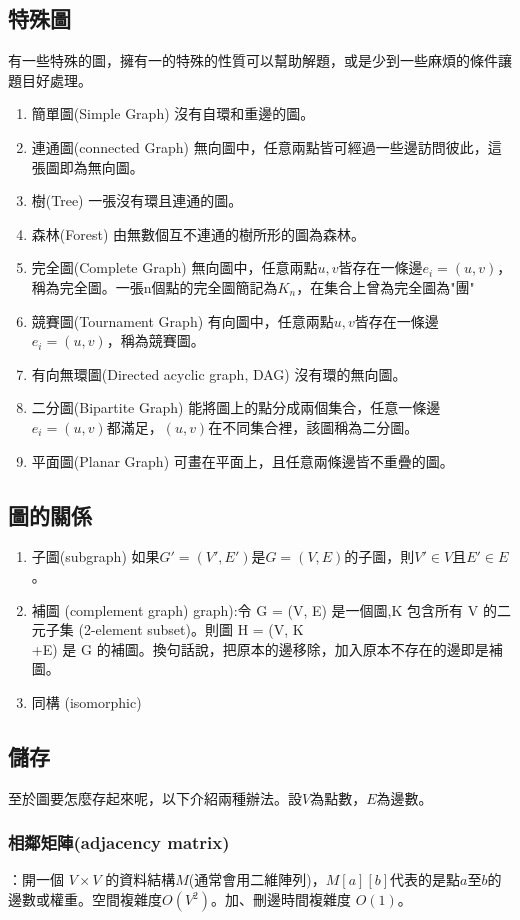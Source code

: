 \subsection{特殊圖}
有一些特殊的圖，擁有一的特殊的性質可以幫助解題，或是少到一些麻煩的條件讓題目好處理。
\begin{enumerate}
\item 簡單圖(Simple Graph) 沒有自環和重邊的圖。
\item 連通圖(connected Graph) 無向圖中，任意兩點皆可經過一些邊訪問彼此，這張圖即為無向圖。
\item 樹(Tree) 一張沒有環且連通的圖。
\item 森林(Forest) 由無數個互不連通的樹所形的圖為森林。
\item 完全圖(Complete Graph) 無向圖中，任意兩點$u, v$皆存在一條邊$e_i = (u, v)$，稱為完全圖。一張n個點的完全圖簡記為$K_n$，在集合上曾為完全圖為"團"
\item 競賽圖(Tournament Graph) 有向圖中，任意兩點$u, v$皆存在一條邊$e_i = (u, v)$，稱為競賽圖。
\item 有向無環圖(Directed acyclic graph, DAG) 沒有環的無向圖。
\item 二分圖(Bipartite Graph) 能將圖上的點分成兩個集合，任意一條邊$e_i = (u, v)$都滿足，$(u, v)$在不同集合裡，該圖稱為二分圖。
\item 平面圖(Planar Graph) 可畫在平面上，且任意兩條邊皆不重疊的圖。
\end{enumerate}
\subsection{圖的關係}
\begin{enumerate}
\item 子圖(subgraph) 如果$G'=(V', E')$是$G=(V, E)$的子圖，則$V'\in V$且$E'\in E$。
\item 補圖 (complement graph) graph):令 G = (V, E) 是一個圖,K 包含所有 V 的二元子集 (2-element subset)。則圖 H = (V, K\\+E) 是 G 的補圖。換句話說，把原本的邊移除，加入原本不存在的邊即是補圖。
\item 同構 (isomorphic)
\end{enumerate}
\subsection{儲存}
至於圖要怎麼存起來呢，以下介紹兩種辦法。設$V$為點數，$E$為邊數。
\subsubsection{相鄰矩陣(adjacency matrix)}：開一個 $V \times V$ 的資料結構$M$(通常會用二維陣列)，$M[a][b]$代表的是點$a$至$b$的邊數或權重。空間複雜度$O(V^2)$。加、刪邊時間複雜度 $O(1)$。
